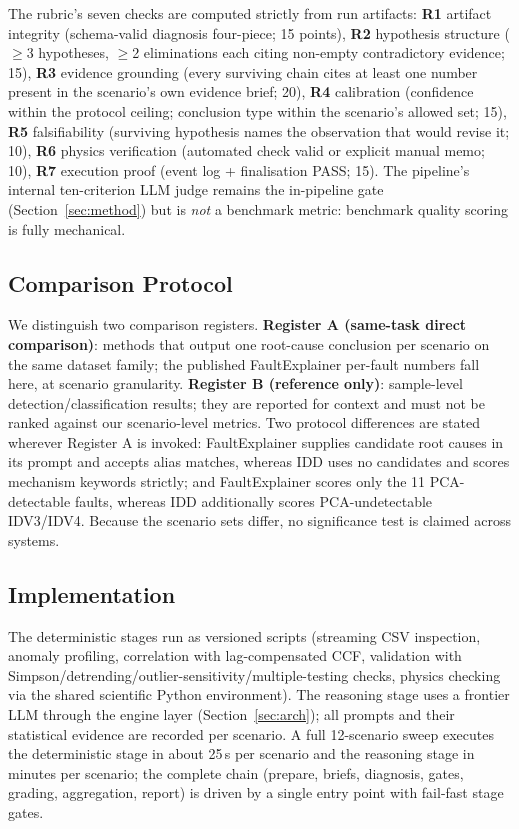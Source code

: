 \documentclass[journal]{IEEEtran}
\begin{document}
The rubric's seven checks are computed strictly from run artifacts: \textbf{R1} artifact integrity (schema-valid diagnosis four-piece; 15 points), \textbf{R2} hypothesis structure ($\ge$3 hypotheses, $\ge$2 eliminations each citing non-empty contradictory evidence; 15), \textbf{R3} evidence grounding (every surviving chain cites at least one number present in the scenario's own evidence brief; 20), \textbf{R4} calibration (confidence within the protocol ceiling; conclusion type within the scenario's allowed set; 15), \textbf{R5} falsifiability (surviving hypothesis names the observation that would revise it; 10), \textbf{R6} physics verification (automated check valid or explicit manual memo; 10), \textbf{R7} execution proof (event log + finalisation PASS; 15). The pipeline's internal ten-criterion LLM judge remains the in-pipeline gate (Section~\ref{sec:method}) but is \emph{not} a benchmark metric: benchmark quality scoring is fully mechanical.

\subsection{Comparison Protocol}
We distinguish two comparison registers. \textbf{Register A (same-task direct comparison)}: methods that output one root-cause conclusion per scenario on the same dataset family; the published FaultExplainer per-fault numbers fall here, at scenario granularity. \textbf{Register B (reference only)}: sample-level detection/classification results; they are reported for context and must not be ranked against our scenario-level metrics. Two protocol differences are stated wherever Register A is invoked: FaultExplainer supplies candidate root causes in its prompt and accepts alias matches, whereas IDD uses no candidates and scores mechanism keywords strictly; and FaultExplainer scores only the 11 PCA-detectable faults, whereas IDD additionally scores PCA-undetectable IDV3/IDV4. Because the scenario sets differ, no significance test is claimed across systems.

\subsection{Implementation}
The deterministic stages run as versioned scripts (streaming CSV inspection, anomaly profiling, correlation with lag-compensated CCF, validation with Simpson/detrending/outlier-sensitivity/multiple-testing checks, physics checking via the shared scientific Python environment). The reasoning stage uses a frontier LLM through the engine layer (Section~\ref{sec:arch}); all prompts and their statistical evidence are recorded per scenario. A full 12-scenario sweep executes the deterministic stage in about 25\,s per scenario and the reasoning stage in minutes per scenario; the complete chain (prepare, briefs, diagnosis, gates, grading, aggregation, report) is driven by a single entry point with fail-fast stage gates.
\end{document}
